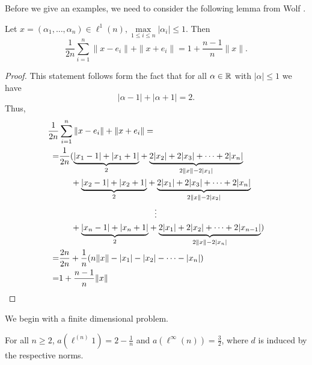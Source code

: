 %
%

Before we give an examples, we need to consider the following lemma from Wolf \cite{wolf:spheres}.
\begin{lemma}\label{lem:sum-of-norms}
	Let $x=(\alpha_1,\dots,\alpha_n)\in \ell^1(n), \max\limits_{1\leq i\leq n}|\alpha_i|\leq 1$. Then
	\[
	\frac{1}{2n}\sum_{i=1}^{n}\|x-e_i\|+\|x+e_i\|=1+\frac{n-1}{n}\|x\|.
	\]
\end{lemma}

\begin{proof}
	This statement follows form the fact that for all $\alpha\in \mathbb{R}$ with $|\alpha|\leq 1$ we have
	\[
	|\alpha-1|+|\alpha+1|=2.
	\]
	Thus,
	\begin{align*}
		\frac{1}{2n}&\sum_{i=1}^n\|x-e_i\|+\|x+e_i\|=
		\\
		=&\frac{1}{2n}(\underset{2}{\underbrace{|x_1-1|+|x_1+1|}}+\underset{2\|x\|-2|x_1|}{\underbrace{2|x_2|+2|x_3|+\cdots+2|x_n|}}
		\\
		&\hspace{.5cm}+\underset{2}{\underbrace{|x_2-1|+|x_2+1|}}+\underset{2\|x\|-2|x_2|}{\underbrace{2|x_1|+2|x_3|+\cdots+2|x_n|}}
		\\
		&\hspace{4cm}\vdots
		\\
		&\hspace{.5cm}+\underset{2}{\underbrace{|x_n-1|+|x_n+1|}}+\underset{2\|x\|-2|x_n|}{\underbrace{2|x_1|+2|x_2|+\cdots+2|x_{n-1}|}})
		\\
		=&\frac{2n}{2n}+\frac{1}{n}(n\|x\|-|x_1|-|x_2|-\cdots-|x_n|)
		\\
		=&1+\frac{n-1}{n}\|x\| 
	\end{align*}\qedhere
\end{proof}


We begin with a finite dimensional problem.
\begin{lemma}\label{lem:l1(n)-l-infinity(n)}
	For all $n\geq 2$, $a(\ell^{(n)}1)=2-\frac{1}{n}$ and $a(\ell^\infty(n))=\frac{3}{2}$, where $d$ is induced by the respective norms.
\end{lemma}

